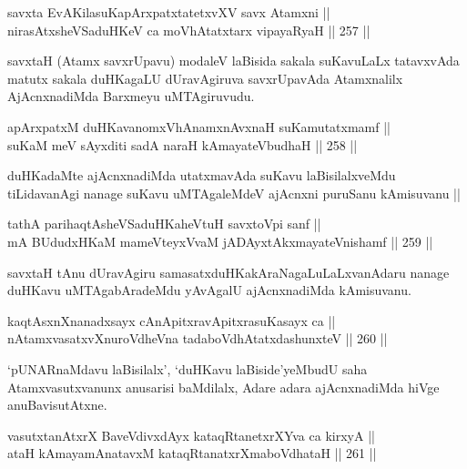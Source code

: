 
\begin{shl}
savxta EvAKilasuKapArxpatxtatetxvXV savx Atamxni || \\
nirasAtxsheVSaduHKeV ca moVhAtatxtarx vipayaRyaH \hfill || 257 ||  
\end{shl}

\begin{artha}
savxtaH (Atamx savxrUpavu) modaleV laBisida sakala suKavuLaLx
tatavxvAda matutx sakala duHKagaLU dUravAgiruva savxrUpavAda
Atamxnalilx AjAcnxnadiMda Barxmeyu uMTAgiruvudu.
\end{artha}


\begin{shl}
apArxpatxM duHKavanomxVhAnamxnAvxnaH suKamutatxmamf || \\
suKaM meV sAyxditi sadA naraH kAmayateV\s budhaH \hfill || 258 ||  
\end{shl}

\begin{artha}
duHKadaMte ajAcnxnadiMda utatxmavAda suKavu laBisilalxveMdu
tiLidavanAgi nanage suKavu uMTAgaleMdeV ajAcnxni puruSanu kAmisuvanu ||
\end{artha}

\begin{shl}
tathA parihaqtAsheVSaduHKaheVtuH savxtoV\s pi sanf || \\
mA BUdudxHKaM mameVteyxVvaM jADAyxtAkxmayateV\s nishamf \hfill || 259 || 
\end{shl}

\begin{artha}
savxtaH tAnu dUravAgiru samasatxduHKakAraNagaLuLaLxvanAdaru nanage
duHKavu uMTAgabAradeMdu yAvAgalU ajAcnxnadiMda kAmisuvanu.
\end{artha}

\begin{shl}
kaqtAsxnXnanadxsayx cAnApitxravApitxrasuKasayx ca || \\
nA\s \s tamxvasatxvXnuroVdheVna tadaboVdhAtatxdashunxteV \hfill || 260 ||  
\end{shl}

\begin{artha}
`pUNARnaMdavu laBisilalx', `duHKavu laBiside'yeMbudU saha
Atamxvasutxvanunx anusarisi baMdilalx, Adare adara ajAcnxnadiMda hiVge anuBavisutAtxne.
\end{artha}

\begin{shl}
vasutxtanAtxrX BaveVdivxdAyx kataqRtanetxrXYva ca kirxyA ||  \\
ataH kAmayamAnatavxM kataqRtanatxrXmaboVdhataH \hfill || 261 ||  
\end{shl}


